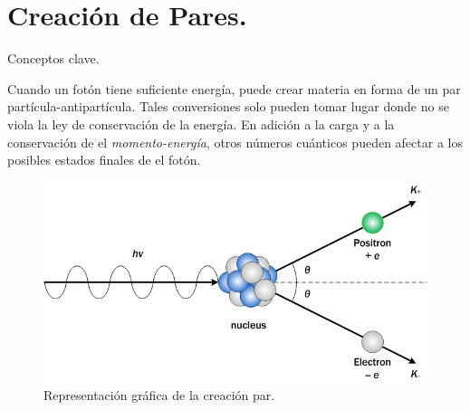 \documentclass{beamer}
\begin{document}
\section{Creación de Pares.}

\begin{frame}{Conceptos clave.}




Cuando un fotón tiene suficiente energía, puede crear materia en forma de un par partícula-antipartícula. Tales conversiones solo pueden tomar lugar donde no se viola la ley de conservación de la energía. En adición a la carga y a la conservación de el \textit{momento-energía}, otros números cuánticos pueden afectar a los posibles estados finales de el fotón.


\begin{figure}[h]
\includegraphics[scale=.18]{par1.jpg}
\caption{\label{fig:creacionpar}Representación gráfica de la creación par.}
\end{figure}

\vskip 1cm

\end{frame}
\end{document}
